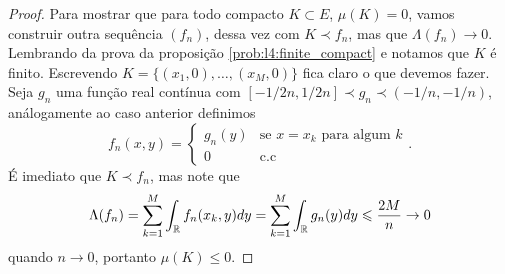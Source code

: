 \begin{proof}
    Para mostrar que para todo compacto $K \subset E$, $\mu(K) = 0$, vamos construir outra sequência $(f_n)$, dessa vez
    com $K \prec f_n$, mas que $\Lambda(f_n) \to 0$. Lembrando da prova da proposição \ref{prob:l4:finite_compact} e notamos 
    que $K$ é finito. Escrevendo $K = \{(x_1,0), \dots, (x_M,0)\}$ fica claro o que devemos fazer. Seja $g_n$ uma função real contínua 
    com $[-1/2n, 1/2n] \prec g_n \prec (-1/n,-1/n)$, análogamente ao caso anterior definimos 
    $$f_n(x,y) = \begin{cases}
        g_n(y) & \text{se } x = x_k \text{ para algum } k\\
        0 & \text{c.c}
    \end{cases}.$$
    É imediato que $K \prec f_n$, mas note que 
    $$\Lambda(f_n) = \sum_{k = 1}^{M} \int_{\mathbb{R}} f_n(x_k, y)dy = \sum_{k=1}^{M} \int_{\mathbb{R}} g_n(y)dy \leqslant \frac{2M}{n} \rightarrow 0$$
    quando $n \to 0$, portanto $\mu(K) \leq 0$.
\end{proof}

